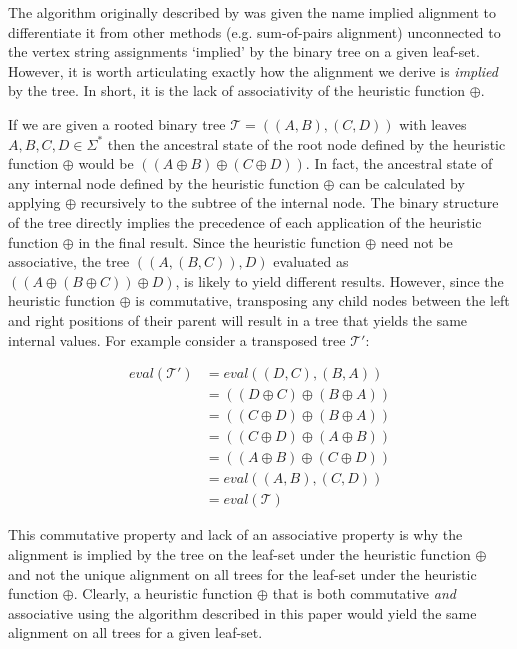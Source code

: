\documentclass[11pt]{article}
\begin{document}
The algorithm originally described by \cite{Wheeler2003} was given the name implied alignment to differentiate it from other methods (e.g. sum-of-pairs alignment) unconnected to the vertex string assignments `implied' by the binary tree on a given leaf-set. 
However, it is worth articulating exactly how the alignment we derive is \emph{implied} by the tree.
In short, it is the lack of associativity of the heuristic function $\oplus$.

If we are given a rooted binary tree $\mathcal{T} = ((A,B),(C,D))$ with leaves $A, B, C, D \in \Sigma^{*}$ then the ancestral state of the root node defined by the heuristic function $\oplus$ would be $((A \oplus B) \oplus (C \oplus D))$. 
In fact, the ancestral state of any internal node defined by the heuristic function $\oplus$ can be calculated by applying $\oplus$ recursively to the subtree of the internal node.
The binary structure of the tree directly implies the precedence of each application of the heuristic function $\oplus$ in the final result.
Since the heuristic function $\oplus$ need not be associative, the tree $((A,(B,C)),D)$ evaluated as $((A \oplus (B \oplus C)) \oplus D)$, is likely to yield different results.
However, since the heuristic function $\oplus$ is commutative, transposing any child nodes between the left and right positions of their parent will result in a tree that yields the same internal values. 
For example consider a transposed tree $\mathcal{T'}$:

\begin{align*}
  eval(\mathcal{T'}) &= eval((D,C),(B,A))
\\  &= ((D \oplus C) \oplus (B \oplus A))
\\  &= ((C \oplus D) \oplus (B \oplus A))
\\  &= ((C \oplus D) \oplus (A \oplus B))
\\  &= ((A \oplus B) \oplus (C \oplus D))
\\  &= eval((A,B),(C,D))
\\  &= eval(\mathcal{T})
\end{align*}

This commutative property and lack of an associative property is why the alignment is implied by the tree on the leaf-set under the heuristic function $\oplus$ and not the unique alignment on all trees for the leaf-set under the heuristic function $\oplus$.
Clearly, a heuristic function $\oplus$ that is both commutative \emph{and} associative using the algorithm described in this paper would yield the same alignment on all trees for a given leaf-set.
\end{document}
